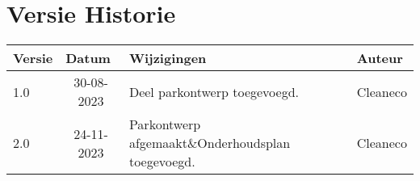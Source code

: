 \section*{Versie Historie} 

\begin{table}[h]
\begin{tabular}{|l|l|l|l|}
\hline
\rowcolor[HTML]{4472C4} 
{\color[HTML]{FFFFFF} \textbf{Versie}} &
  {\color[HTML]{FFFFFF} \textbf{Datum}} &
  {\color[HTML]{FFFFFF} \textbf{Wijzigingen}} &
  {\color[HTML]{FFFFFF} \textbf{Auteur}} \\ \hline
\rowcolor[HTML]{D9E1F2} 
1.0 &
  \multicolumn{1}{c|}{\cellcolor[HTML]{D9E1F2}30-08-2023} &
 Deel parkontwerp toegevoegd. &
  Cleaneco \\ \hline
\rowcolor[HTML]{D9E1F2} 
2.0 &
  \multicolumn{1}{c|}{\cellcolor[HTML]{D9E1F2}24-11-2023} &
 Parkontwerp afgemaakt\&Onderhoudsplan toegevoegd. &
  Cleaneco \\ \hline


\end{tabular}
\end{table}
{}
\listoffigures
{}
{}
\listofmyequations